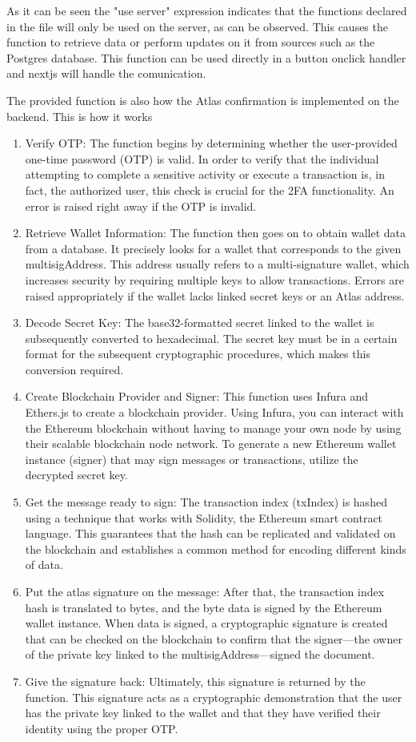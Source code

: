 As it can be seen the "use server" expression indicates that the functions declared in the file will only be used on the server, as can be observed. This causes the function to retrieve data or perform updates on it from sources such as the Postgres database. This function can be used directly in a button onclick handler and nextjs will handle the comunication. 
\par The provided function is also how the Atlas confirmation is implemented on the backend. This is how it works
\begin{enumerate}
\item Verify OTP: The function begins by determining whether the user-provided one-time password (OTP) is valid. In order to verify that the individual attempting to complete a sensitive activity or execute a transaction is, in fact, the authorized user, this check is crucial for the 2FA functionality. An error is raised right away if the OTP is invalid.
\item Retrieve Wallet Information: The function then goes on to obtain wallet data from a database. It precisely looks for a wallet that corresponds to the given multisigAddress. This address usually refers to a multi-signature wallet, which increases security by requiring multiple keys to allow transactions. Errors are raised appropriately if the wallet lacks linked secret keys or an Atlas address.
\item Decode Secret Key: The base32-formatted secret linked to the wallet is subsequently converted to hexadecimal. The secret key must be in a certain format for the subsequent cryptographic procedures, which makes this conversion required.
\item Create Blockchain Provider and Signer: This function uses Infura and Ethers.js to create a blockchain provider. Using Infura, you can interact with the Ethereum blockchain without having to manage your own node by using their scalable blockchain node network. To generate a new Ethereum wallet instance (signer) that may sign messages or transactions, utilize the decrypted secret key.
\item Get the message ready to sign: The transaction index (txIndex) is hashed using a technique that works with Solidity, the Ethereum smart contract language. This guarantees that the hash can be replicated and validated on the blockchain and establishes a common method for encoding different kinds of data.
\item Put the atlas signature on the message: After that, the transaction index hash is translated to bytes, and the byte data is signed by the Ethereum wallet instance. When data is signed, a cryptographic signature is created that can be checked on the blockchain to confirm that the signer—the owner of the private key linked to the multisigAddress—signed the document.
\item Give the signature back: Ultimately, this signature is returned by the function. This signature acts as a cryptographic demonstration that the user has the private key linked to the wallet and that they have verified their identity using the proper OTP. 
\end{enumerate}
